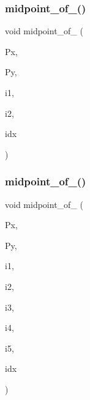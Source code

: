 \mbox{\label{global_8_c_afa308439c2c10c488ab9b03f92b01652}} 
\subsubsection{\texorpdfstring{midpoint\+\_\+of\+\_()}{midpoint\_of\_2()}}
{\footnotesize\ttfamily void midpoint\+\_\+of\+\_ (\begin{DoxyParamCaption}\item[{\mbox{\hyperlink{galois_8h_a09fddde158a3a20bd2dcadb609de11dc}{I\+NT}} $\ast$}]{Px,  }\item[{\mbox{\hyperlink{galois_8h_a09fddde158a3a20bd2dcadb609de11dc}{I\+NT}} $\ast$}]{Py,  }\item[{\mbox{\hyperlink{galois_8h_a09fddde158a3a20bd2dcadb609de11dc}{I\+NT}}}]{i1,  }\item[{\mbox{\hyperlink{galois_8h_a09fddde158a3a20bd2dcadb609de11dc}{I\+NT}}}]{i2,  }\item[{\mbox{\hyperlink{galois_8h_a09fddde158a3a20bd2dcadb609de11dc}{I\+NT}}}]{idx }\end{DoxyParamCaption})}

\mbox{\label{global_8_c_a5d61fdb18030de0eb1e66608d37a2b9b}} 
\subsubsection{\texorpdfstring{midpoint\+\_\+of\+\_()}{midpoint\_of\_5()}}
{\footnotesize\ttfamily void midpoint\+\_\+of\+\_ (\begin{DoxyParamCaption}\item[{\mbox{\hyperlink{galois_8h_a09fddde158a3a20bd2dcadb609de11dc}{I\+NT}} $\ast$}]{Px,  }\item[{\mbox{\hyperlink{galois_8h_a09fddde158a3a20bd2dcadb609de11dc}{I\+NT}} $\ast$}]{Py,  }\item[{\mbox{\hyperlink{galois_8h_a09fddde158a3a20bd2dcadb609de11dc}{I\+NT}}}]{i1,  }\item[{\mbox{\hyperlink{galois_8h_a09fddde158a3a20bd2dcadb609de11dc}{I\+NT}}}]{i2,  }\item[{\mbox{\hyperlink{galois_8h_a09fddde158a3a20bd2dcadb609de11dc}{I\+NT}}}]{i3,  }\item[{\mbox{\hyperlink{galois_8h_a09fddde158a3a20bd2dcadb609de11dc}{I\+NT}}}]{i4,  }\item[{\mbox{\hyperlink{galois_8h_a09fddde158a3a20bd2dcadb609de11dc}{I\+NT}}}]{i5,  }\item[{\mbox{\hyperlink{galois_8h_a09fddde158a3a20bd2dcadb609de11dc}{I\+NT}}}]{idx }\end{DoxyParamCaption})}

